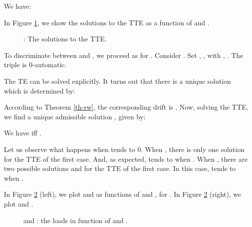 \documentclass[11pt,a4paper]{article}
\theoremstyle{remark}
\begin{document}
We have:


In Figure \ref{fi-stable_c}, we show the solutions to the TTE as a function of
 and .

\begin{figure}[ht]

\caption{: The solutions to the TTE.}
\label{fi-stable_c}
\end{figure}


To discriminate between  and , we proceed
as for .
Consider . Set ,
,  with , .  The triple
 is 0-automatic. 

The TE can be solved explicitly. It turns out that there is a unique
solution  which
is determined by:


According to Theorem \ref{th-rw}, the corresponding drift is
.
Now, solving the TTE,
we find a unique admissible
solution , given by:


We have  iff
.

Let us observe what happens when  tends to 0. When
, there is only one solution  for the TTE of
the first case. And, as expected,  tends to
 when . When , there
are two possible solutions  and  for
the TTE of the first case. In this  case,  tends to
 when .


In Figure \ref{ab=1_c_p=2/5} (left), we
plot  and  as functions of  and ,
for . In Figure \ref{ab=1_c_p=2/5} (right), we
plot  and .


\begin{figure}[ht]
 
\caption{ and : the
  loads in function of  and .}
\label{ab=1_c_p=2/5}
\end{figure}
\end{document}
